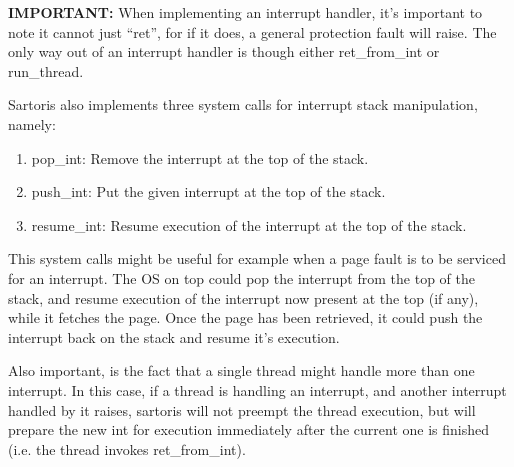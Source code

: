 \documentclass[11pt, letterpaper, twoside, english]{book}
\begin{document}
\textbf{IMPORTANT:} When implementing an interrupt handler, it's important to note it cannot just "`ret"', for if it does, a general protection fault will raise. The only way out of an interrupt handler is though either \textsf{ret\_from\_int} or \textsf{run\_thread}.
       
Sartoris also implements three system calls for interrupt stack manipulation, namely:

\begin{enumerate}
\item[]\textsf{pop\_int}: Remove the interrupt at the top of the stack.
\item[]\textsf{push\_int}: Put the given interrupt at the top of the stack.
\item[]\textsf{resume\_int}: Resume execution of the interrupt at the top of the stack.
\end{enumerate}

This system calls might be useful for example when a page fault is to be serviced for an interrupt. The OS on top could pop the interrupt from the top of the stack, and resume execution of the interrupt now present at the top (if any), while it fetches the page. Once the page has been retrieved, it could push the interrupt back on the stack and resume it's execution.

Also important, is the fact that a single thread might handle more than one interrupt. In this case, if a thread is handling an interrupt, and another interrupt handled by it raises, sartoris will not preempt the thread execution, but will prepare the new int for execution immediately after the current one is finished (i.e. the thread invokes \textsf{ret\_from\_int}).
\end{document}
